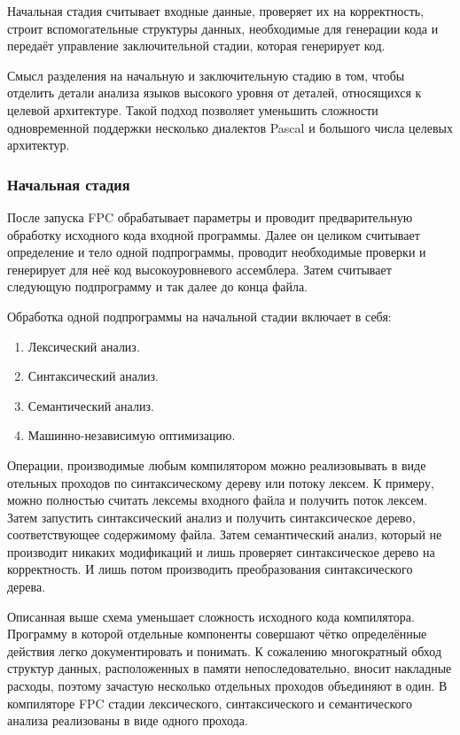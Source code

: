 \documentclass{imcs}
\begin{document}
Начальная стадия считывает входные данные, проверяет их на корректность, строит
вспомогательные структуры данных, необходимые для генерации кода и передаёт 
управление заключительной стадии, которая генерирует код.

Смысл разделения на начальную и заключительную стадию в
том, чтобы отделить детали анализа языков высокого уровня от деталей,
относящихся к целевой архитектуре. Такой подход позволяет уменьшить сложности
одновременной поддержки несколько диалектов Pascal и большого числа целевых
архитектур.

\subsubsection{Начальная стадия}

После запуска FPC обрабатывает параметры и проводит предварительную обработку
исходного кода входной программы. Далее он целиком считывает определение и тело
одной подпрограммы, проводит необходимые проверки и генерирует для неё
код высокоуровневого ассемблера. Затем считывает следующую подпрограмму и так далее
до конца файла.

Обработка одной подпрограммы на начальной стадии включает в себя:
\begin{enumerate}
    \item Лексический анализ.
    \item Синтаксический анализ.
    \item Семантический анализ.
    \item Машинно-независимую оптимизацию.
\end{enumerate}

Операции, производимые любым компилятором можно реализовывать в виде
отельных проходов по синтаксическому дереву или потоку лексем. К примеру, можно
полностью считать лексемы входного файла и получить поток лексем. Затем запустить
синтаксический анализ и получить синтаксическое дерево, соответствующее содержимому
файла. Затем семантический анализ, который не производит никаких модификаций и 
лишь проверяет синтаксическое дерево на корректность. И лишь потом производить
преобразования синтаксического дерева.

Описанная выше схема уменьшает сложность исходного кода компилятора. Программу в которой отдельные 
компоненты совершают чётко определённые действия легко документировать и понимать.
К сожалению многократный обход структур данных, расположенных в памяти непоследовательно,
вносит накладные расходы\cite{kaspersky}, поэтому
зачастую несколько отдельных проходов объединяют в один. В компиляторе FPC стадии
лексического, синтаксического и семантического анализа реализованы в виде одного
прохода. 
\end{document}
